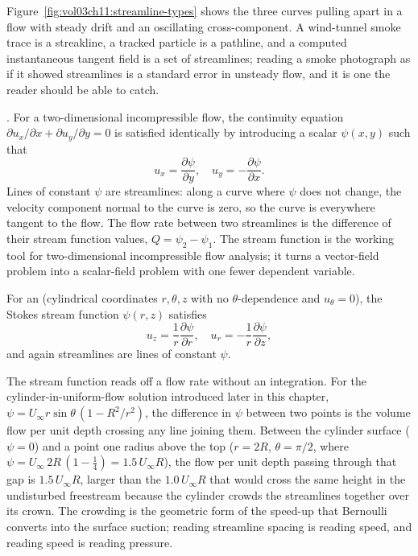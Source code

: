 

Figure~\ref{fig:vol03ch11:streamline-types} shows the three curves
pulling apart in a flow with steady drift and an oscillating
cross-component. A wind-tunnel smoke trace is a streakline, a tracked
particle is a pathline, and a computed instantaneous tangent field is
a set of streamlines; reading a smoke photograph as if it showed
streamlines is a standard error in unsteady flow, and it is one the
reader should be able to catch.

. For a
two-dimensional incompressible flow, the continuity equation
$\partial u_x/\partial x + \partial u_y/\partial y = 0$ is
satisfied identically by introducing a scalar  $\psi(x, y)$ such that
\[
u_x = \frac{\partial \psi}{\partial y}, \quad
u_y = -\frac{\partial \psi}{\partial x}.
\]
Lines of constant $\psi$ are streamlines: along a curve where
$\psi$ does not change, the velocity component normal to the curve
is zero, so the curve is everywhere tangent to the flow. The flow
rate between two streamlines is the difference of their stream
function values, $Q = \psi_2 - \psi_1$. The stream function is the
working tool for two-dimensional incompressible flow analysis; it
turns a vector-field problem into a scalar-field problem with one
fewer dependent variable.

For an  (cylindrical coordinates $r,
\theta, z$ with no $\theta$-dependence and $u_\theta = 0$), the
Stokes stream function $\psi(r, z)$ satisfies
\[
u_z = \frac{1}{r}\frac{\partial \psi}{\partial r}, \quad
u_r = -\frac{1}{r}\frac{\partial \psi}{\partial z},
\]
and again streamlines are lines of constant $\psi$.

The stream function reads off a flow rate without an integration. For
the cylinder-in-uniform-flow solution introduced later in this chapter,
$\psi = U_\infty r\sin\theta\,(1 - R^2/r^2)$, the difference in $\psi$
between two points is the volume flow per unit depth crossing any line
joining them. Between the cylinder surface ($\psi = 0$) and a point one
radius above the top ($r = 2R$, $\theta = \pi/2$, where $\psi =
U_\infty\,2R\,(1 - \tfrac14) = 1.5\,U_\infty R$), the flow per unit
depth passing through that gap is $1.5\,U_\infty R$, larger than the
$1.0\,U_\infty R$ that would cross the same height in the undisturbed
freestream because the cylinder crowds the streamlines together over
its crown. The crowding is the geometric form of the speed-up that
Bernoulli converts into the surface suction; reading streamline spacing
is reading speed, and reading speed is reading pressure.

